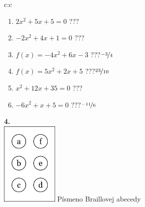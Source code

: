 \documentclass[10pt]{report}
\begin{document}
\begin{tabular}{c:c}
\begin{minipage}[c][104.5mm][t]{0.5\linewidth}
\begin{center}
\begin{minipage}{0.79\linewidth}
\begin{center}
\begin{varwidth}{\linewidth}
\begin{enumerate}
\Large
\item $2x^2+5x+5=0$\quad \dotfill\; ???\;\dotfill {}
\item $-2x^2+4x+1=0$\quad \dotfill\; ???\;\dotfill {}
\item $f(x)=-4x^2+6x-3$\quad \dotfill\; ???\;\dotfill \quad $\nicefrac{-3}{4}$
\item $f(x)=5x^2+2x+5$\quad \dotfill\; ???\;\dotfill \quad $\nicefrac{23}{10}$
\item $x^2+12x+35=0$\quad \dotfill\; ???\;\dotfill {}
\item $-6x^2+x+5=0$\quad \dotfill\; ???\;\dotfill \quad $\nicefrac{-11}{6}$
\end{enumerate}
\end{varwidth}
\end{center}
\end{minipage}
\begin{minipage}{0.20\linewidth}
\begin{center}
{\Huge\bfseries 4.} \\[2mm]
\includegraphics[height=40mm]{../images/braille.png}
{\small Písmeno Braillovej abecedy}
\end{center}
\end{minipage}
\end{center}
\end{minipage}
%
\end{tabular}
\newpage
\thispagestyle{empty}
\end{document}
